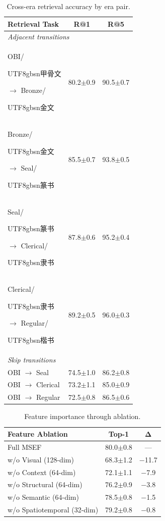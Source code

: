 \documentclass{article}
\newcommand{\cg}[1]{\begin{CJK*}{UTF8}{gbsn}#1\end{CJK*}}
\begin{document}
\begin{table}[t]
\centering
\small
\caption{Cross-era retrieval accuracy by era pair.}
\label{tab:cross_era}
\begin{tabular}{lcc}
\toprule
\textbf{Retrieval Task} & \textbf{R@1} & \textbf{R@5} \\
\midrule
\multicolumn{3}{l}{\textit{Adjacent transitions}} \\
OBI/\cg{甲骨文} $\to$ Bronze/\cg{金文} & 80.2{\scriptsize$\pm$0.9} & 90.5{\scriptsize$\pm$0.7} \\
Bronze/\cg{金文} $\to$ Seal/\cg{篆书} & 85.5{\scriptsize$\pm$0.7} & 93.8{\scriptsize$\pm$0.5} \\
Seal/\cg{篆书} $\to$ Clerical/\cg{隶书} & 87.8{\scriptsize$\pm$0.6} & 95.2{\scriptsize$\pm$0.4} \\
Clerical/\cg{隶书} $\to$ Regular/\cg{楷书} & 89.2{\scriptsize$\pm$0.5} & 96.0{\scriptsize$\pm$0.3} \\
\midrule
\multicolumn{3}{l}{\textit{Skip transitions}} \\
OBI $\to$ Seal & 74.5{\scriptsize$\pm$1.0} & 86.2{\scriptsize$\pm$0.8} \\
OBI $\to$ Clerical & 73.2{\scriptsize$\pm$1.1} & 85.0{\scriptsize$\pm$0.9} \\
OBI $\to$ Regular & 72.5{\scriptsize$\pm$0.8} & 86.5{\scriptsize$\pm$0.6} \\
\bottomrule
\end{tabular}
\end{table}


\begin{table}[h]
\centering
\small
\caption{Feature importance through ablation.}
\label{tab:feature_importance}
\begin{tabular}{lcc}
\toprule
\textbf{Feature Ablation} & \textbf{Top-1} & $\boldsymbol{\Delta}$ \\
\midrule
Full MSEF & 80.0{\scriptsize$\pm$0.8} & --- \\
w/o Visual (128-dim) & 68.3{\scriptsize$\pm$1.2} & $-$11.7 \\
w/o Context (64-dim) & 72.1{\scriptsize$\pm$1.1} & $-$7.9 \\
w/o Structural (64-dim) & 76.2{\scriptsize$\pm$0.9} & $-$3.8 \\
w/o Semantic (64-dim) & 78.5{\scriptsize$\pm$0.8} & $-$1.5 \\
w/o Spatiotemporal (32-dim) & 79.2{\scriptsize$\pm$0.8} & $-$0.8 \\
\bottomrule
\end{tabular}
\end{table}
\end{document}
